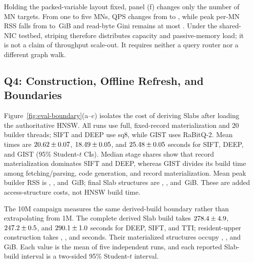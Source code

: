 \documentclass[sigconf,nonacm]{acmart}
\begin{document}
Holding the packed-variable layout fixed, panel (f) changes only the number of
MN targets.  From one to five MNs, QPS changes from
\ClaimVariableOneMnQps{} to \ClaimVariableFiveMnQps{}, while peak per-MN RSS
falls from \ClaimVariableOneMnRssGiB{} to
\ClaimVariableFiveMnRssGiB{}\,GiB and read-byte Gini remains at most
\ClaimVariableReadGini.  Under the shared-NIC testbed, striping therefore
distributes capacity and passive-memory load; it is not a claim of throughput
scale-out.  It requires neither a query router nor a different graph walk.

\subsection{Q4: Construction, Offline Refresh, and Boundaries}
\label{sec:eval-rebuild}
\label{sec:eval-scope}

Figure~\ref{fig:eval-boundary}(a--c) isolates the cost of deriving Slabs after
loading the authoritative HNSW\@.  All runs use full, fixed-record
materialization and 20 builder threads; SIFT and DEEP use sq8, while GIST uses
RaBitQ-2.  Mean times
are $20.62\pm0.07$,
$18.49\pm0.05$, and
$25.48\pm0.05$ seconds for SIFT,
DEEP, and GIST (95\% Student-$t$ CIs).  Median stage shares show that record
materialization dominates SIFT and DEEP, whereas GIST divides its build time
among fetching/parsing, code generation, and record materialization.  Mean
peak builder RSS is \ClaimBuildOneMSiftRssGiB{},
\ClaimBuildOneMDeepRssGiB{}, and
\ClaimBuildOneMGistRssGiB{}\,GiB; final Slab structures are
\ClaimBuildOneMSiftRegionGiB{}, \ClaimBuildOneMDeepRegionGiB{}, and
\ClaimBuildOneMGistRegionGiB{}\,GiB.  These are added access-structure costs,
not HNSW build time.

The 10M campaign measures the same derived-build boundary rather than
extrapolating from 1M.  The complete derived Slab build takes
$278.4\pm4.9$,
$247.2\pm0.5$, and
$290.1\pm1.0$ seconds for DEEP,
SIFT, and TTI; resident-upper construction takes
\ClaimBuildTenMDeepResidentSeconds{}, \ClaimBuildTenMSiftResidentSeconds{}, and
\ClaimBuildTenMTtiResidentSeconds{} seconds.  Their materialized structures
occupy \ClaimBuildTenMDeepGiB{}, \ClaimBuildTenMSiftGiB{}, and
\ClaimBuildTenMTtiGiB{}\,GiB.  Each value is the mean of five independent
runs, and each reported Slab-build interval is a two-sided 95\% Student-$t$
interval.
\end{document}
